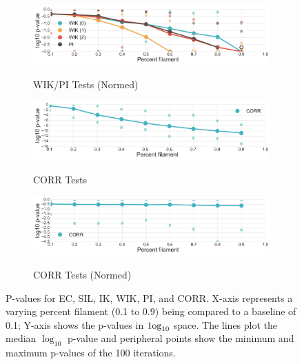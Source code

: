 \documentclass[12pt]{article}
\begin{document}
\begin{description}
\begin{center}
\begin{figure}[htp!]
\begin{subfigure}{.45\textwidth}
        \label{fig:all_weight}
      \end{subfigure}
      \begin{subfigure}{.45\textwidth}
        \centering
        \caption{WIK/PI Tests (Normed)}
        \includegraphics[width=\linewidth]{figure_8_all_weighted_contour_group_normed.pdf}
        \label{fig:all_weight_normed}
      \end{subfigure}
      \begin{subfigure}{.45\textwidth}
        \caption{CORR Tests}
        \includegraphics[width=\linewidth]{figure_8_all_correlation_group.pdf}
        \label{fig:all_corr}
      \end{subfigure}
      \begin{subfigure}{.45\textwidth}
        \caption{CORR Tests (Normed)}
        \includegraphics[width=\linewidth]{figure_8_all_correlation_group_normed.pdf}
        \label{fig:all_corr_normed}
      \end{subfigure}
      \caption{P-values for EC, SIL, IK, WIK, PI, and CORR. X-axis represents a varying percent filament (0.1 to 0.9) being compared to a baseline of 0.1; Y-axis shows the p-values in $\textup{1og}_{10}$ space. The lines plot the median $\log_{10}$ p-value and peripheral points show the minimum and maximum p-values of the 100 iterations. }
      \label{fig:linesUnnormApp}
    \end{figure}
  \end{center}
\end{description}




\end{document}
